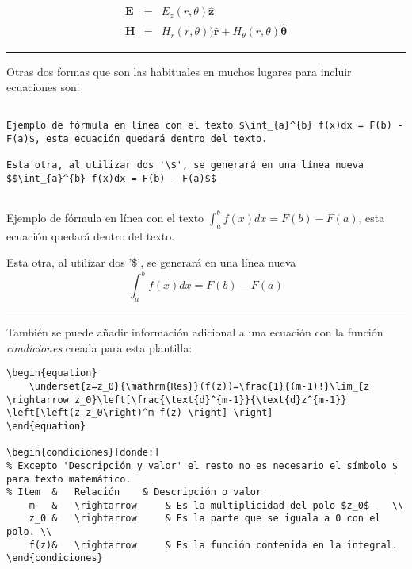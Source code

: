 \begin{subequations}
  \begin{eqnarray}
    {\mathbf E}&=&E_z(r,\theta)\hat{\mathbf z}\label{ecu1} \\
    {\mathbf H}&=&H_r(r,\theta))\hat{ \mathbf r}+H_\theta(r,\theta)\hat{\bm
      \theta}\label{ecu2}
  \end{eqnarray}
\end{subequations}
\vspace{1em}
\noindent\hrule
\vspace{1em}
Otras dos formas que son las habituales en muchos lugares para incluir ecuaciones son:
\begin{lstlisting}[style=Latex-color,label=latex_code]

Ejemplo de fórmula en línea con el texto $\int_{a}^{b} f(x)dx = F(b) - F(a)$, esta ecuación quedará dentro del texto.

Esta otra, al utilizar dos '\$', se generará en una línea nueva $$\int_{a}^{b} f(x)dx = F(b) - F(a)$$
	
\end{lstlisting}

Ejemplo de fórmula en línea con el texto $\int_{a}^{b} f(x)dx = F(b) - F(a)$, esta ecuación quedará dentro del texto.

Esta otra, al utilizar dos '\$', se generará en una línea nueva $$\int_{a}^{b} f(x)dx = F(b) - F(a)$$
\vspace{1em}
\noindent\hrule
\vspace{1em}
También se puede añadir información adicional a una ecuación con la función \textit{condiciones} creada para esta plantilla:

\begin{lstlisting}[style=Latex-color]
\begin{equation}
	\underset{z=z_0}{\mathrm{Res}}(f(z))=\frac{1}{(m-1)!}\lim_{z \rightarrow z_0}\left[\frac{\text{d}^{m-1}}{\text{d}z^{m-1}} \left[\left(z-z_0\right)^m f(z) \right] \right]
\end{equation}

\begin{condiciones}[donde:]
% Excepto 'Descripción y valor' el resto no es necesario el símbolo $ para texto matemático.
% Item	&	Relación	& Descripción o valor 	
	m 	&	\rightarrow 	& Es la multiplicidad del polo $z_0$	\\
	z_0 &	\rightarrow 	& Es la parte que se iguala a 0 con el polo. \\
	f(z)&	\rightarrow 	& Es la función contenida en la integral.
\end{condiciones}
\end{lstlisting}

